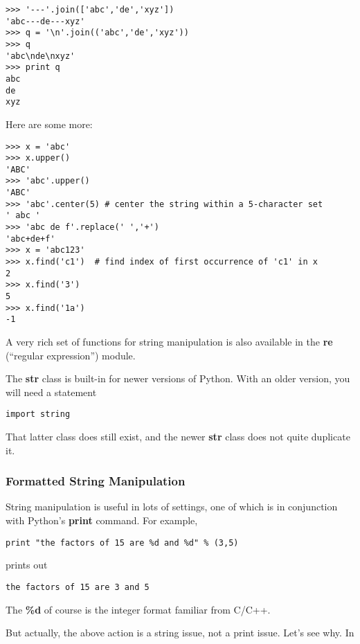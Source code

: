 \begin{Verbatim}[fontsize=\relsize{-2}]
>>> '---'.join(['abc','de','xyz'])
'abc---de---xyz'
>>> q = '\n'.join(('abc','de','xyz'))
>>> q
'abc\nde\nxyz'
>>> print q
abc
de
xyz
\end{Verbatim}

Here are some more:

\begin{Verbatim}[fontsize=\relsize{-2}]
>>> x = 'abc'
>>> x.upper()
'ABC'
>>> 'abc'.upper()
'ABC'
>>> 'abc'.center(5) # center the string within a 5-character set
' abc '
>>> 'abc de f'.replace(' ','+')
'abc+de+f'
>>> x = 'abc123'
>>> x.find('c1')  # find index of first occurrence of 'c1' in x
2
>>> x.find('3')
5
>>> x.find('1a')
-1
\end{Verbatim}

A very rich set of functions for string manipulation is also available
in the {\bf re} (``regular expression'') module.

The {\bf str} class is built-in for newer versions of Python.  With
an older version, you will need a statement

\begin{Verbatim}[fontsize=\relsize{-2}]
import string
\end{Verbatim}

That latter class does still exist, and the newer {\bf str} class does
not quite duplicate it.

\subsubsection{Formatted String Manipulation}
\label{formatted}

String manipulation is useful in lots of settings, one of which is in
conjunction with Python's {\bf print} command.  For example,

\begin{Verbatim}[fontsize=\relsize{-2}]
print "the factors of 15 are %d and %d" % (3,5) 
\end{Verbatim}

prints out

\begin{Verbatim}[fontsize=\relsize{-2}]
the factors of 15 are 3 and 5
\end{Verbatim}

The {\bf \%d} of course is the integer format familiar from C/C++.

But actually, the above action is a string issue, not a print issue.
Let's see why.  In

